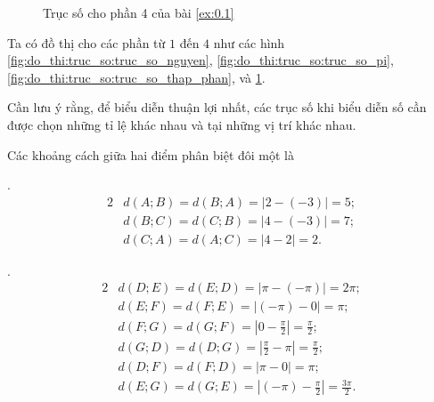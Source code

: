 \begin{figure}[H]
   \centering
   \caption{Trục số cho phần 4 của bài \ref{ex:0.1}}
   \label{fig:do_thi:truc_so:truc_so_xap_xi_pi}
\end{figure}



Ta có đồ thị cho các phần từ $1$ đến $4$ như các hình \ref{fig:do_thi:truc_so:truc_so_nguyen}, \ref{fig:do_thi:truc_so:truc_so_pi}, \ref{fig:do_thi:truc_so:truc_so_thap_phan}, và \ref{fig:do_thi:truc_so:truc_so_xap_xi_pi}.

Cần lưu ý rằng, để biểu diễn thuận lợi nhất, các trục số khi biểu diễn số cần được chọn những tỉ lệ khác nhau và tại những vị trí khác nhau.

Các khoảng cách giữa hai điểm phân biệt đôi một là

\setcounter{subexercise}{1}
. \begin{alignat*}{2}
      &d(A;B) = d(B;A) = \left|2 - (-3)\right| = 5; \\
      &d(B;C) = d(C;B) = \left|4 - (-3)\right| = 7; \\
      &d(C;A) = d(A;C) = \left|4 - 2\right| = 2.
\end{alignat*}

. \begin{alignat*}{2}
      &d(D;E) = d(E;D) = \left|\pi - (-\pi)\right| = 2\pi; \\
      &d(E;F) = d(F;E) = \left|(-\pi) - 0\right| = \pi; \\
      &d(F;G) = d(G;F) = \left|0 - \frac{\pi}{2}\right| = \frac{\pi}{2}; \\
      &d(G;D) = d(D;G) = \left|\frac{\pi}{2} - \pi\right| = \frac{\pi}{2}; \\
      &d(D;F) = d(F;D) = \left|\pi - 0\right| = \pi;\\
      &d(E;G) = d(G;E) = \left|(-\pi) - \frac{\pi}{2}\right| = \frac{3\pi}{2}.
\end{alignat*}

